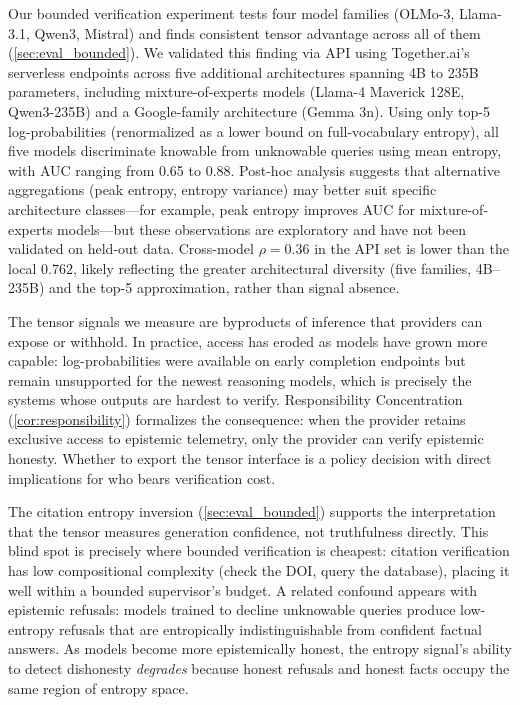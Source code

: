 Our bounded verification experiment tests four model families (OLMo-3, Llama-3.1,
Qwen3, Mistral) and finds consistent tensor advantage across all of them
(\autoref{sec:eval_bounded}).
%
We validated this finding via API using Together.ai's serverless endpoints
across five additional architectures spanning 4B to 235B parameters, including
mixture-of-experts models (Llama-4 Maverick 128E, Qwen3-235B) and a
Google-family architecture (Gemma 3n). Using only top-5 log-probabilities
(renormalized as a lower bound on full-vocabulary entropy), all five models
discriminate knowable from unknowable queries using mean entropy, with AUC
ranging from 0.65 to 0.88. Post-hoc analysis suggests that alternative
aggregations (peak entropy, entropy variance) may better suit specific
architecture classes---for example, peak entropy improves AUC for
mixture-of-experts models---but these observations are exploratory and have
not been validated on held-out data.
Cross-model $\rho = 0.36$ in the API set is lower than the local $0.762$,
likely reflecting the greater architectural diversity (five families, 4B--235B)
and the top-5 approximation, rather than signal absence.

The tensor signals we measure are byproducts of inference that providers can
expose or withhold. In practice, access has eroded as models have grown more
capable: log-probabilities were available on early completion endpoints but
remain unsupported for the newest reasoning models, which is precisely the systems
whose outputs are hardest to verify. Responsibility Concentration
(\autoref{cor:responsibility}) formalizes the consequence: when the provider
retains exclusive access to epistemic telemetry, only the provider can verify
epistemic honesty. Whether to export the tensor interface is a policy
decision with direct implications for who bears verification cost.

 The citation entropy inversion
(\autoref{sec:eval_bounded}) supports the interpretation that the tensor
measures generation confidence, not truthfulness directly. This blind spot is
precisely where bounded verification is cheapest: citation verification has
low compositional complexity (check the DOI, query the database), placing it
well within a bounded supervisor's budget.
A related confound appears with epistemic refusals: models trained to decline
unknowable queries produce low-entropy refusals that are entropically
indistinguishable from confident factual answers. As models become more
epistemically honest, the entropy signal's ability to detect dishonesty
\emph{degrades} because honest refusals and honest facts occupy the same
region of entropy space.

